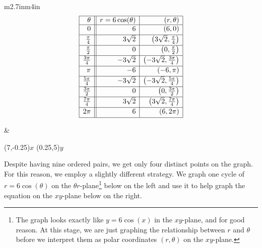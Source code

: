 \hspace{.25in} \begin{tabular}{m{2.7in}m{4in}}
\setlength{\extrarowheight}{2pt}
\[ \begin{array}{|r||r|r|}  

\hline

\theta & r = 6\cos(\theta) & (r,\theta) \\ \hline
0  & 6 & (6,0) \\ [2pt]   \hline
\frac{\pi}{4}  & 3\sqrt{2} & \left(3\sqrt{2}, \frac{\pi}{4}\right) \\ [2pt] \hline 
\frac{\pi}{2}  & 0 & \left(0,\frac{\pi}{2}\right) \\ [2pt] \hline 
\frac{3\pi}{4}  & -3\sqrt{2} & \left(-3\sqrt{2}, \frac{3\pi}{4}\right) \\ [2pt] \hline 
\pi & -6 & (-6,\pi) \\ [2pt] \hline 
\frac{5\pi}{4}  & -3\sqrt{2} & \left(-3\sqrt{2}, \frac{5\pi}{4}\right) \\ [2pt] \hline 
\frac{3\pi}{2}  & 0 & \left(0, \frac{3\pi}{2} \right) \\ [2pt] \hline 
\frac{7\pi}{4}  & 3\sqrt{2} & \left(3\sqrt{2}, \frac{7\pi}{4}\right) \\ [2pt] \hline 
2\pi  & 6 & (6,2\pi) \\  [2pt] \hline
\end{array} \]
\setlength{\extrarowheight}{0pt}

& 
\hspace*{.5in}
\begin{mfpic}[15]{-3}{7}{-5}{5}
\axes
{}
\tlabel[cc](7,-0.25){\scriptsize $x$}
\tlabel[cc](0.25,5){\scriptsize $y$}
\tlpointsep{4pt}
\scriptsize
{}
\normalsize
\end{mfpic}

\end{tabular}

Despite having nine ordered pairs, we get only four distinct points on the graph.  For this reason, we employ a slightly different strategy.  We graph one cycle of $r = 6\cos(\theta)$ on the $\theta r$-plane\footnote{The graph looks exactly like $y = 6\cos(x)$ in the $xy$-plane, and for good reason. At this stage, we are just graphing the relationship between $r$ and $\theta$ before we interpret them as polar coordinates $(r,\theta)$ on the $xy$-plane.} below on the left and use it to help graph the equation on the $xy$-plane below on the right.  

